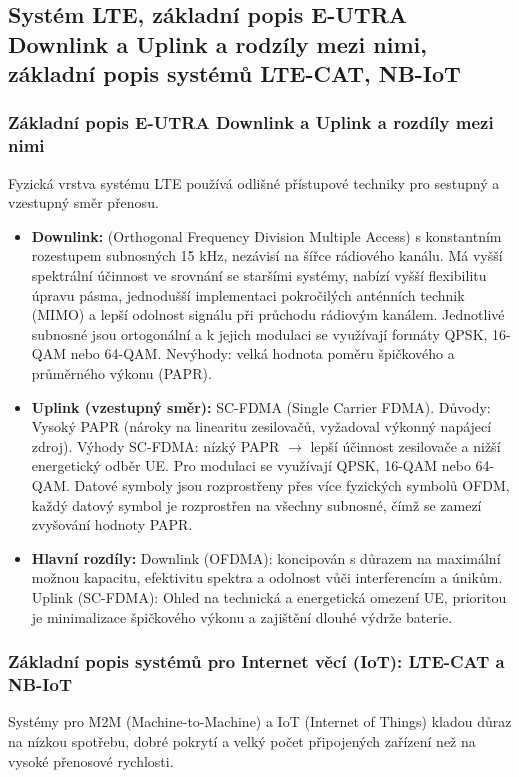 	\subsection{Systém LTE, základní popis E-UTRA Downlink a Uplink a rodzíly mezi nimi, základní popis systémů LTE-CAT, NB-IoT}
		\subsubsection{Základní popis E-UTRA Downlink a Uplink a rozdíly mezi nimi}
		Fyzická vrstva systému LTE používá odlišné přístupové techniky pro sestupný a vzestupný směr přenosu.
			\begin{itemize}
				\item \textbf{Downlink:}  (Orthogonal Frequency Division Multiple Access) s konstantním rozestupem subnosných 15 kHz, nezávisí na šířce rádiového kanálu. Má vyšší spektrální účinnost ve srovnání se staršími systémy, nabízí vyšší flexibilitu úpravu pásma, jednodušší implementaci pokročilých anténních technik (MIMO) a lepší odolnost signálu při průchodu rádiovým kanálem. Jednotlivé subnosné jsou ortogonální a k jejich modulaci se využívají formáty QPSK, 16-QAM nebo 64-QAM. Nevýhody: velká hodnota poměru špičkového a průměrného výkonu (PAPR).
				\item \textbf{Uplink (vzestupný směr):} SC-FDMA (Single Carrier FDMA). Důvody: Vysoký PAPR (nároky na linearitu zesilovačů, vyžadoval výkonný napájecí zdroj). Výhody SC-FDMA: nízký PAPR $\rightarrow$ lepší účinnost zesilovače a nižší energetický odběr UE. Pro modulaci se využívají QPSK, 16-QAM nebo 64-QAM. Datové symboly jsou rozprostřeny přes více fyzických symbolů OFDM, každý datový symbol je rozprostřen na všechny subnosné, čímž se zamezí zvyšování hodnoty PAPR.
				\item \textbf{Hlavní rozdíly:} Downlink (OFDMA): koncipován s důrazem na maximální možnou kapacitu, efektivitu spektra a odolnost vůči interferencím a únikům. Uplink (SC-FDMA): Ohled na technická a energetická omezení UE, prioritou je minimalizace špičkového výkonu a zajištění dlouhé výdrže baterie.
			\end{itemize}
		\subsubsection{Základní popis systémů pro Internet věcí (IoT): LTE-CAT a NB-IoT}
		Systémy pro M2M (Machine-to-Machine) a IoT (Internet of Things) kladou důraz na nízkou spotřebu, dobré pokrytí a velký počet připojených zařízení než na vysoké přenosové rychlosti.
